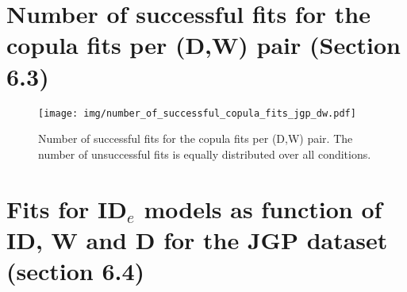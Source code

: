 \documentclass{article}
\begin{document}
\section{Number of successful fits for the copula fits per (D,W) pair (Section 6.3)}

\begin{figure}[htbp]
    \centering
    \texttt{[image: img/number\_of\_successful\_copula\_fits\_jgp\_dw.pdf]}
    \caption{Number of successful fits for the copula fits per (D,W) pair. The number of unsuccessful fits is equally distributed over all conditions.}
\end{figure}


\section{Fits for ID$_e$ models as function of ID, W and D for the JGP dataset (section 6.4)}
\end{document}
